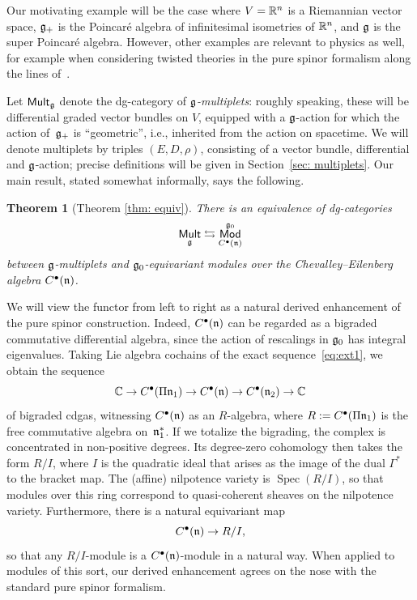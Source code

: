 \documentclass[pdftex]{sigma}
\numberwithin{equation}{section}
\newtheorem*{thm*}{Theorem}
\def\cat#1{\ensuremath{\mathsf{#1}}}
\DeclareMathOperator{\Mod}{\cat{Mod}}
\DeclareMathOperator{\Mult}{\cat{Mult}}
\def\bu{\bullet}
\DeclareMathOperator{\Spec}{Spec}
\begin{document}
Our motivating example will be
the case where $V=\mathbb R^n$ is a Riemannian vector space, $\mathfrak g_+$ is the Poincar\'e algebra of infinitesimal isometries of $\mathbb R^n$, and $\mathfrak g$ is the super Poincar\'e algebra. However, other examples are relevant to physics as well, for example when considering twisted theories in the pure spinor formalism along the lines of~\cite{spinortwist}.

Let $\Mult_{\fg}$ denote the dg-category of \emph{$\mathfrak g$-multiplets}: roughly speaking, these will be differential graded vector bundles on $V$, equipped with a $\mathfrak g$-action for which the action of~$\mathfrak g_+$ is ``geometric'', i.e., inherited from the action on spacetime. We will denote multiplets by triples $(E,D,\rho)$, consisting of a vector bundle, differential and $\mathfrak g$-action; precise definitions will be given in Section~\ref{sec: multiplets}. Our main result, stated somewhat informally, says the following.

\begin{thm*}[Theorem \ref{thm: equiv}]
	There is an equivalence of dg-categories
	\begin{equation}
	\label{informal_equivalence}
	\Mult_{\fg} \leftrightarrows \Mod_{C^\bullet(\fn)}^{\fg_0}
	\end{equation}
	between $\mathfrak g$-multiplets and $\mathfrak g_0$-equivariant modules over the Chevalley--Eilenberg algebra $C^\bullet(\mathfrak n)$.
\end{thm*}

We will view the functor from left to right as a natural derived enhancement of the pure spinor construction. Indeed, $C^\bullet(\mathfrak n)$ can be regarded as a bigraded commutative differential algebra, since the action of rescalings in $\mathfrak g_0$ has integral eigenvalues.
Taking Lie algebra cochains of the exact sequence~\eqref{eq:ext1}, we obtain the sequence
\begin{equation*}
	\CC \to C^\bu(\Pi \fn_1) \to C^\bu(\fn) \to C^\bu(\fn_2) \to \CC
\end{equation*}
of bigraded cdgas, witnessing $C^\bu(\fn)$ as an $R$-algebra, where $R := C^\bu(\Pi \fn_1)$ is the free commutative algebra on~$\mathfrak n_1^*$.
If we totalize the bigrading, the complex is concentrated in non-positive degrees. Its degree-zero cohomology then takes the form $R/I$, where $I$ is the quadratic ideal that arises as the image of the dual $\Gamma^*$ to the bracket map. The (affine) nilpotence variety is $\Spec(R/I)$, so that modules over this ring correspond to quasi-coherent sheaves on the nilpotence variety. Furthermore, there is a natural equivariant map
\begin{equation*}
	C^\bu(\fn) \to R/I,
\end{equation*}
so that any $R/I$-module is a $C^\bu(\fn)$-module in a natural way. When applied to modules of this sort, our derived enhancement agrees on the nose with the standard pure spinor formalism.
\end{document}
